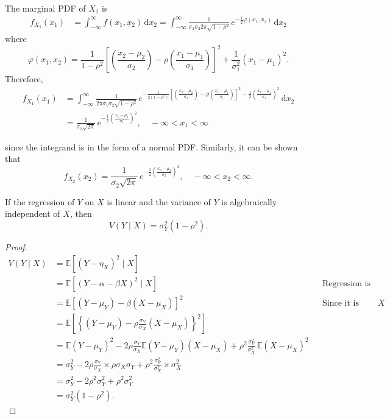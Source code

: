 The marginal PDF of $X_1$ is
\begin{align*}
    f_{X_1}(x_1) &= \int_{-\infty}^{\infty} f(x_1, x_2) \, \mathrm{d}x_2 = \int_{-\infty}^{\infty} \frac{1}{\sigma_1 \sigma_2 2\pi \sqrt{1 - \rho^2}} \, e^{-\frac{1}{2} \varphi(x_1, x_2)} \, \mathrm{d}x_2
\end{align*}
where
\[
    \varphi(x_1, x_2) = \frac{1}{1 - \rho^2} \left[ \left( \frac{x_2 - \mu_2}{\sigma_2} \right) - \rho \left( \frac{x_1 - \mu_1}{\sigma_1} \right) \right]^2 + \frac{1}{\sigma_1^2} \left( x_1 - \mu_1 \right)^2.
\]
Therefore,
\begin{align*}
    f_{X_1}(x_1) &= \int_{-\infty}^{\infty} \frac{1}{2\pi \sigma_1 \sigma_2 \sqrt{1 - \rho^2}} \, e^{-\frac{1}{2(1-\rho^2)} \left[ \left( \frac{x_2 - \mu_2}{\sigma_2} \right) - \rho \left( \frac{x_1 - \mu_1}{\sigma_1} \right) \right]^2 - \frac{1}{2} \left( \frac{x_1 - \mu_1}{\sigma_1} \right)^2} \, \mathrm{d}x_2 \\
    &= \frac{1}{\sigma_1 \sqrt{2\pi}} \, e^{-\frac{1}{2} \left( \frac{x_1 - \mu_1}{\sigma_1} \right)^2}, \quad -\infty < x_1 < \infty
\end{align*}

since the integrand is in the form of a normal PDF. Similarly, it can be shown that
\[
    f_{X_2}(x_2) = \frac{1}{\sigma_2 \sqrt{2\pi}} \, e^{-\frac{1}{2} \left( \frac{x_2 - \mu_2}{\sigma_2} \right)^2}, \quad -\infty < x_2 < \infty.
\]

\begin{theorem}
    If the regression of $Y$ on $X$ is linear and the variance of $Y$ is algebraically independent of $X$, then
    \[
        V(Y \mid X) = \sigma_Y^2 (1 - \rho^2).
    \]
\end{theorem}
\begin{proof}
    \begin{align*}
        V(Y \mid X) &= \mathbb{E}\left[ (Y - \eta_X)^2 \mid X \right]\\
        &= \mathbb{E}\left[ (Y - \alpha - \beta X)^2 \mid X \right] && \text{Regression is linear}\\
        &= \mathbb{E}\left[ (Y - \mu_Y) - \beta (X - \mu_X) \right]^2 && \text{Since it is independent of } X\\
        &= \mathbb{E}\left[ \left\{ (Y - \mu_Y) - \rho \frac{\sigma_Y}{\sigma_X} (X - \mu_X) \right\}^2 \right]\\
        &= \mathbb{E}(Y - \mu_Y)^2 - 2\rho \frac{\sigma_Y}{\sigma_X} \mathbb{E}(Y - \mu_Y)(X - \mu_X) + \rho^2 \frac{\sigma_Y^2}{\sigma_X^2}\, \mathbb{E}(X - \mu_X)^2\\
        &= \sigma_Y^2 - 2\rho \frac{\sigma_Y}{\sigma_X} \times \rho \sigma_X \sigma_Y + \rho^2 \frac{\sigma_Y^2}{\sigma_X^2} \times \sigma_X^2\\
        &= \sigma_Y^2 - 2\rho^2 \sigma_Y^2 + \rho^2 \sigma_Y^2\\
        &= \sigma_Y^2 (1 - \rho^2).
    \end{align*}
\end{proof}

